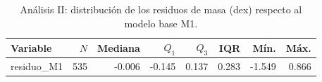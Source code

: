 \begin{table}[htbp]
    \centering
    \caption{Análisis II: distribución de los residuos de masa (dex) respecto al modelo base M1.}
    \label{tab:A2-T5}
    \small
    \begin{tabular}{lrrrrrrr}
    \toprule
    Variable & $N$ & Mediana & $Q_1$ & $Q_3$ & IQR & Mín. & Máx. \\
    \midrule
    residuo\_M1 & 535 & -0.006 & -0.145 & 0.137 & 0.283 & -1.549 & 0.866 \\
    \bottomrule
    \end{tabular}
\end{table}
